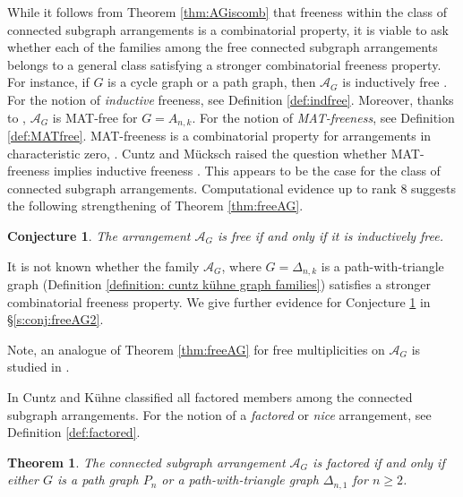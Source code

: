 \documentclass[12pt]{amsart}
\newcommand\CA{{\mathscr A}}
\numberwithin{equation}{section}
\theoremstyle{plain}
\newtheorem{theorem}[equation]{Theorem}
\newtheorem{conjecture}[equation]{Conjecture}
\theoremstyle{definition}
\begin{document}
While it follows from Theorem \ref{thm:AGiscomb} that freeness within the class of connected subgraph arrangements is a combinatorial property, it is viable to ask whether each of the families among the free connected subgraph arrangements belongs to a general class satisfying
a stronger combinatorial freeness property. For instance, if $G$ is a cycle graph or a path graph, then $\CA_G$ is inductively free \cite[Prop.~3.1, Cor.~8.11]{cuntzkuehne:subgraphs}.
For the notion of 
\emph{inductive} freeness, see Definition
\ref{def:indfree}. 
Moreover, thanks to  \cite[Thm.~4.1]{cuntzkuehne:subgraphs}, $\CA_G$ is MAT-free for $G = A_{n,k}$. 
For the notion of \emph{MAT-freeness}, see Definition
\ref{def:MATfree}. 
MAT-freeness is a combinatorial property for arrangements in characteristic zero, \cite[Lem.~18]{Cunzmuecksch:MATfree}.
Cuntz and M\"ucksch raised the question whether
MAT-freeness implies inductive freeness \cite[Ques.~3]{Cunzmuecksch:MATfree}.
This appears to be the case 
for the class of connected subgraph arrangements. Computational evidence up to rank $8$ suggests the following strengthening of 
Theorem \ref{thm:freeAG}.

\begin{conjecture}
	\label{conj:freeAG2}
	The 
	arrangement $\CA_G$ is free if and only if it is inductively free.
\end{conjecture}

It is not known whether the family 
$\CA_G$, where $G = \Delta_{n,k}$ is a path-with-triangle graph (Definition \ref{definition: cuntz kühne graph families})
satisfies a stronger combinatorial freeness property. We give further evidence for Conjecture \ref{conj:freeAG2} in \S \ref{s:conj:freeAG2}.

Note, an analogue of Theorem \ref{thm:freeAG} for free multiplicities on $\CA_G$ is studied in \cite{mueckschroehrlewiesner}.



In \cite[Thm.~1.8(1)]{cuntzkuehne:subgraphs} Cuntz and K\"uhne classified all factored members among the connected subgraph arrangements. 
For the notion of a \emph{factored} or \emph{nice} arrangement, see Definition \ref{def:factored}.

\begin{theorem}
	\label{thm:factoredAG}
	The connected subgraph arrangement $\CA_G$ is factored if and only if either $G$ is  a path graph $P_n$ or a path-with-triangle graph $\Delta_{n,1}$ for $n \ge 2$.
\end{theorem}
\end{document}
